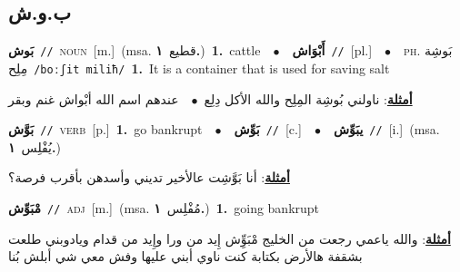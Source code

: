 \documentclass[10pt,a4paper,twoside]{article} %
\begin{document}
\begin{multicols}{2}
\vspace{-3mm}
\subsection*{\color{blue}\foreignlanguage{arabic}{ب.و.ش}\color{blue}{}} 

{\setlength\topsep{0pt}\textbf{\foreignlanguage{arabic}{بَوش}}\ {\color{gray}\texttt{//}\color{black}}\ \textsc{noun}\ [m.]\ \color{gray}(msa. \foreignlanguage{arabic}{قطيع}~\foreignlanguage{arabic}{\textbf{١.}})\color{black}\ \textbf{1.}~cattle\ \ $\bullet$\ \ \setlength\topsep{0pt}\textbf{\foreignlanguage{arabic}{أَبْوَاش}}\ {\color{gray}\texttt{//}\color{black}}\ [pl.]\ \ $\bullet$\ \ \textsc{ph.} \color{gray} \foreignlanguage{arabic}{بَوشِة مِلِح}\color{black}\ {\color{gray}\texttt{/{\sffamily boːʃit miliħ}/}\color{black}}\ \textbf{1.}~It is a container that is used for saving salt\  \begin{flushright}\color{gray}\foreignlanguage{arabic}{\textbf{\underline{\foreignlanguage{arabic}{أمثلة}}}: ناولني بُوشِة المِلِح والله الأكل دِلِع\ $\bullet$\ \  عندهم اسم الله أبْواش غنم وبقر}\end{flushright}\color{black}} \vspace{2mm}

{\setlength\topsep{0pt}\textbf{\foreignlanguage{arabic}{بَوَّش}}\ {\color{gray}\texttt{//}\color{black}}\ \textsc{verb}\ [p.]\ \textbf{1.}~go bankrupt\ \ $\bullet$\ \ \setlength\topsep{0pt}\textbf{\foreignlanguage{arabic}{بَوِّش}}\ {\color{gray}\texttt{//}\color{black}}\ [c.]\ \ $\bullet$\ \ \setlength\topsep{0pt}\textbf{\foreignlanguage{arabic}{يبَوِّش}}\ {\color{gray}\texttt{//}\color{black}}\ [i.]\ \color{gray}(msa. \foreignlanguage{arabic}{يُفْلِس}~\foreignlanguage{arabic}{\textbf{١.}})\color{black}\  \begin{flushright}\color{gray}\foreignlanguage{arabic}{\textbf{\underline{\foreignlanguage{arabic}{أمثلة}}}: أنا بَوَّشِت عالأخير تديني وأسدهن بأقرب فرصة؟}\end{flushright}\color{black}} \vspace{2mm}

{\setlength\topsep{0pt}\textbf{\foreignlanguage{arabic}{مْبَوِّش}}\ {\color{gray}\texttt{//}\color{black}}\ \textsc{adj}\ [m.]\ \color{gray}(msa. \foreignlanguage{arabic}{مُفْلِس}~\foreignlanguage{arabic}{\textbf{١.}})\color{black}\ \textbf{1.}~going bankrupt\  \begin{flushright}\color{gray}\foreignlanguage{arabic}{\textbf{\underline{\foreignlanguage{arabic}{أمثلة}}}: والله ياعمي رجعت من الخليج مْبَوِِّش إِيد من ورا وإِيد من قدام ويادوبني طلعت بشقفة هالأرض بكتابة كنت ناوي أبني عليها وفش معي شي أبلش بُنا}\end{flushright}\color{black}} \vspace{2mm}


\end{multicols}
\end{document}
